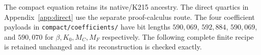 The compact equation retains its native/K215 ancestry. The direct
quartics in Appendix~\ref{app:direct} use the separate proof-calculus route.
The four coefficient payloads in \texttt{compact/coefficients/} have
bit lengths $590{,}069$, $592{,}884$, $590{,}069$, and $590{,}070$
for $\beta,K_0,M_C,M_F$ respectively. The following complete finite
recipe is retained unchanged and its reconstruction is checked exactly.

